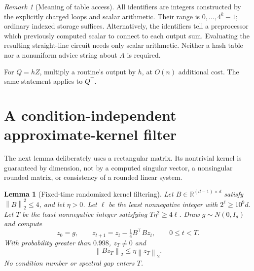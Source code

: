 \documentclass[11pt,a4paper]{article}
\newtheorem{lemma}[theorem]{Lemma}
\theoremstyle{remark}
\newtheorem{remark}[theorem]{Remark}
\newcommand{\R}{\mathbb R}
\newcommand{\norm}[1]{\left\|#1\right\|_2}
\begin{document}
\begin{remark}[Meaning of table access]
All identifiers are integers constructed by the explicitly charged loops and
scalar arithmetic. Their range is $0,\ldots,4^k-1$; ordinary indexed storage
suffices. Alternatively, the identifiers tell a preprocessor which previously
computed scalar to connect to each output sum. Evaluating the resulting
straight-line circuit needs only scalar arithmetic. Neither a hash table nor
a nonuniform advice string about $A$ is required.
\end{remark}

For $Q=hZ$, multiply a routine's output by $h$, at $O(n)$ additional cost.
The same statement applies to $Q^\top$.

\section{A condition-independent approximate-kernel filter}

The next lemma deliberately uses a rectangular matrix. Its nontrivial kernel
is guaranteed by dimension, not by a computed singular vector, a nonsingular
rounded matrix, or consistency of a rounded linear system.

\begin{lemma}[Fixed-time randomized kernel filtering]\label{lem:kernel}
Let $B\in\R^{(d-1)\times d}$ satisfy $\norm{B}^2\le4$, and let $\eta>0$.
Let $\ell$ be the least nonnegative integer with $2^\ell\ge10^9d$.
Let $T$ be the least nonnegative integer satisfying $T\eta^2\ge4\ell$.
Draw $g\sim N(0,I_d)$ and compute
\begin{equation}\label{eq:iteration}
 z_0=g,\qquad z_{t+1}=z_t-\tfrac14B^\top Bz_t,
 \qquad 0\le t<T.
\end{equation}
With probability greater than $0.998$, $z_T\ne0$ and
\begin{equation}\label{eq:approxkernel}
 \norm{Bz_T}\le\eta\norm{z_T}.
\end{equation}
No condition number or spectral gap enters $T$.
\end{lemma}
\end{document}
